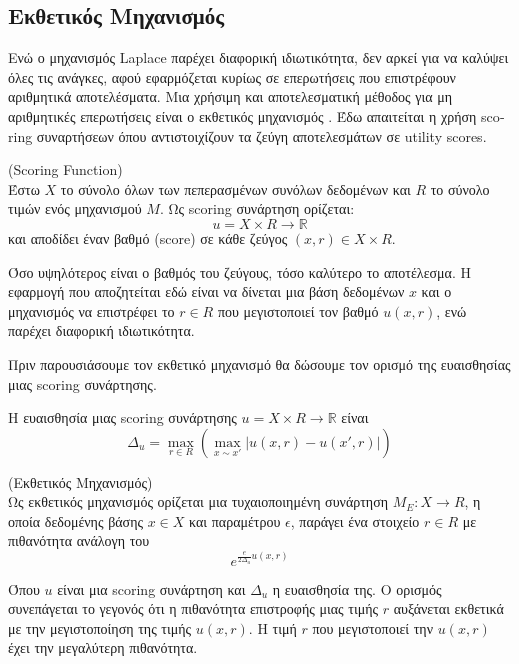 \subsection{Εκθετικός Μηχανισμός}

Ενώ ο μηχανισμός \textlatin{Laplace} παρέχει διαφορική ιδιωτικότητα, δεν αρκεί για να καλύψει όλες τις ανάγκες, αφού εφαρμόζεται κυρίως σε επερωτήσεις που επιστρέφουν αριθμητικά αποτελέσματα. Μια χρήσιμη και αποτελεσματική μέθοδος για μη αριθμητικές επερωτήσεις είναι ο εκθετικός μηχανισμός \textlatin{\cite{dwork2008differential}}. Έδω απαιτείται η χρήση \textlatin{scoring} συναρτήσεων όπου αντιστοιχίζουν τα ζεύγη αποτελεσμάτων σε \textlatin{utility scores}. 

\begin{definition}(\textlatin{Scoring Function)}\\
Έστω $X$ το σύνολο όλων των πεπερασμένων συνόλων δεδομένων και $R$ το σύνολο τιμών ενός μηχανισμού $M$. Ως \textlatin{scoring} συνάρτηση ορίζεται:
$$u=X \times R \longrightarrow \mathbb{R}$$
και αποδίδει έναν βαθμό (\textlatin{score}) σε κάθε ζεύγος $(x,r)\in X \times R$.
 
\end{definition}
Όσο υψηλότερος είναι ο βαθμός του ζεύγους, τόσο καλύτερο το αποτέλεσμα. Η εφαρμογή που αποζητείται εδώ είναι να δίνεται μια βάση δεδομένων $x$ και ο μηχανισμός να επιστρέφει το $r\in R $ που μεγιστοποιεί τον βαθμό $u(x,r)$, ενώ παρέχει διαφορική ιδιωτικότητα.

Πριν παρουσιάσουμε τον εκθετικό μηχανισμό θα δώσουμε τον ορισμό της ευαισθησίας μιας \textlatin{scoring} συνάρτησης.

\begin{definition}
Η ευαισθησία μιας \textlatin{scoring} συνάρτησης $u=X \times R \longrightarrow \mathbb{R}$ είναι
\[ \Delta_u=\max_{r\in R} (\max_{x\sim x'}|u(x,r)-u(x',r)|)\]
\end{definition}

\begin{definition}(Εκθετικός Μηχανισμός)\\
Ως εκθετικός μηχανισμός ορίζεται μια τυχαιοποιημένη συνάρτηση $M_E:X\longrightarrow R$, η οποία δεδομένης βάσης $x\in X$ και παραμέτρου $\epsilon$, παράγει ένα στοιχείο $r\in R$ με πιθανότητα ανάλογη του $$ e^{\frac{e}{2\Delta_u}u(x,r)}$$
\end{definition}
Όπου $u$ είναι μια \textlatin{scoring} συνάρτηση και $\Delta_u$ η ευαισθησία της. O ορισμός συνεπάγεται το γεγονός ότι η πιθανότητα επιστροφής μιας τιμής $r$ αυξάνεται εκθετικά με την μεγιστοποίηση της τιμής $u(x,r)$. Η τιμή $r$ που μεγιστοποιεί την $u(x,r)$ έχει την μεγαλύτερη πιθανότητα.


